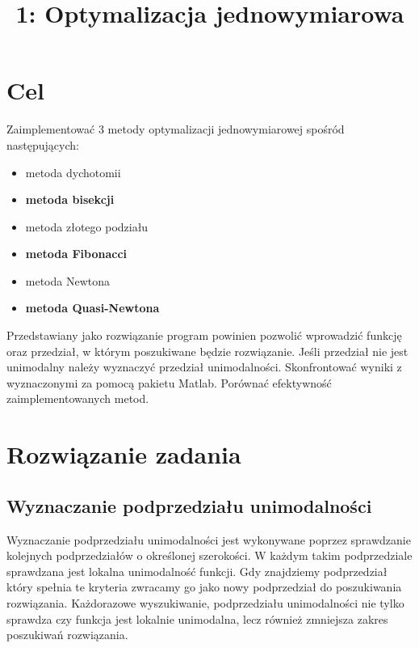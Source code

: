 \documentclass{classrep}
\author{
  \studentinfo{Paweł Musiał}{nr albumu 1} \and
  \studentinfo{Łukasz Michalski}{nr albumu 2}
}
\title{1: Optymalizacja jednowymiarowa} %
\begin{document}
\maketitle


\addtocounter{footnote}{1}

\section{Cel}
Zaimplementować 3 metody optymalizacji jednowymiarowej spośród następujących:
\begin{itemize}
	\item	metoda dychotomii
	\item	\textbf{metoda bisekcji}
	\item	metoda złotego podziału
	\item	\textbf{metoda Fibonacci}
	\item	metoda Newtona
	\item	\textbf{metoda Quasi-Newtona}
\end{itemize}
Przedstawiany jako rozwiązanie program powinien pozwolić wprowadzić funkcję oraz przedział, w którym poszukiwane będzie rozwiązanie. Jeśli przedział nie jest unimodalny należy wyznaczyć przedział unimodalności. Skonfrontować wyniki z wyznaczonymi za pomocą pakietu Matlab. Porównać efektywność zaimplementowanych metod.
\section{Rozwiązanie zadania}

\subsection{Wyznaczanie podprzedziału unimodalności}
Wyznaczanie podprzedziału unimodalności jest wykonywane poprzez sprawdzanie kolejnych podprzedziałów o określonej szerokości. W każdym takim podprzedziale sprawdzana jest lokalna unimodalność funkcji. Gdy znajdziemy podprzedział który spełnia te kryteria zwracamy go jako nowy podprzedział do poszukiwania rozwiązania. Każdorazowe wyszukiwanie, podprzedziału unimodalności nie tylko sprawdza czy funkcja jest lokalnie unimodalna, lecz również zmniejsza zakres poszukiwań rozwiązania.
\end{document}
